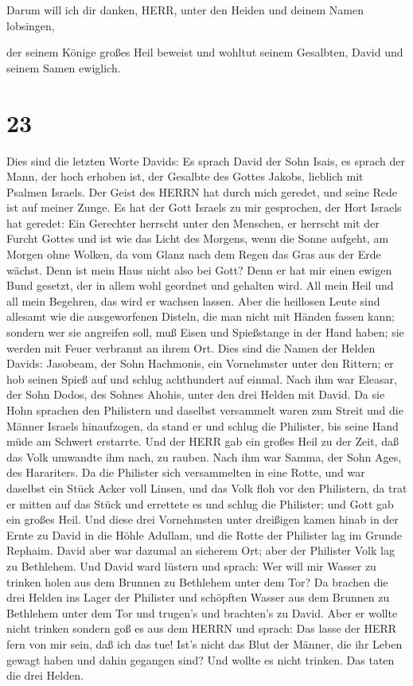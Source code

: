  Darum will ich dir danken, HERR, unter den Heiden und
deinem Namen lobsingen,

 der seinem Könige großes Heil beweist und wohltut seinem
Gesalbten, David und seinem Samen ewiglich.

\hypertarget{section-22}{%
\section{23}\label{section-22}}

 Dies sind die letzten Worte Davids: Es sprach David der
Sohn Isais, es sprach der Mann, der hoch erhoben ist, der Gesalbte des
Gottes Jakobs, lieblich mit Psalmen Israels.  Der Geist des
HERRN hat durch mich geredet, und seine Rede ist auf meiner Zunge.
 Es hat der Gott Israels zu mir gesprochen, der Hort Israels
hat geredet: Ein Gerechter herrscht unter den Menschen, er herrscht mit
der Furcht Gottes  und ist wie das Licht des Morgens, wenn
die Sonne aufgeht, am Morgen ohne Wolken, da vom Glanz nach dem Regen
das Gras aus der Erde wächst.  Denn ist mein Haus nicht also
bei Gott? Denn er hat mir einen ewigen Bund gesetzt, der in allem wohl
geordnet und gehalten wird. All mein Heil und all mein Begehren, das
wird er wachsen lassen.  Aber die heillosen Leute sind
allesamt wie die ausgeworfenen Disteln, die man nicht mit Händen fassen
kann;  sondern wer sie angreifen soll, muß Eisen und
Spießstange in der Hand haben; sie werden mit Feuer verbrannt an ihrem
Ort.  Dies sind die Namen der Helden Davids: Jasobeam, der
Sohn Hachmonis, ein Vornehmster unter den Rittern; er hob seinen Spieß
auf und schlug achthundert auf einmal.  Nach ihm war
Eleasar, der Sohn Dodos, des Sohnes Ahohis, unter den drei Helden mit
David. Da sie Hohn sprachen den Philistern und daselbst versammelt waren
zum Streit und die Männer Israels hinaufzogen,  da stand er
und schlug die Philister, bis seine Hand müde am Schwert erstarrte. Und
der HERR gab ein großes Heil zu der Zeit, daß das Volk umwandte ihm
nach, zu rauben.  Nach ihm war Samma, der Sohn Ages, des
Harariters. Da die Philister sich versammelten in eine Rotte, und war
daselbst ein Stück Acker voll Linsen, und das Volk floh vor den
Philistern,  da trat er mitten auf das Stück und errettete
es und schlug die Philister; und Gott gab ein großes Heil. 
Und diese drei Vornehmsten unter dreißigen kamen hinab in der Ernte zu
David in die Höhle Adullam, und die Rotte der Philister lag im Grunde
Rephaim.  David aber war dazumal an sicherem Ort; aber der
Philister Volk lag zu Bethlehem.  Und David ward lüstern
und sprach: Wer will mir Wasser zu trinken holen aus dem Brunnen zu
Bethlehem unter dem Tor?  Da brachen die drei Helden ins
Lager der Philister und schöpften Wasser aus dem Brunnen zu Bethlehem
unter dem Tor und trugen's und brachten's zu David. Aber er wollte nicht
trinken sondern goß es aus dem HERRN  und sprach: Das lasse
der HERR fern von mir sein, daß ich das tue! Ist's nicht das Blut der
Männer, die ihr Leben gewagt haben und dahin gegangen sind? Und wollte
es nicht trinken. Das taten die drei Helden.

